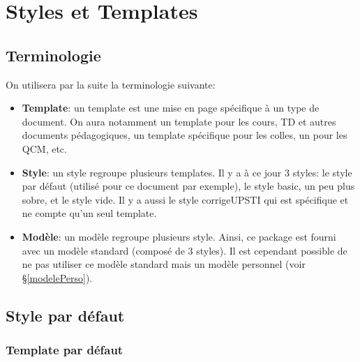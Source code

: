 \documentclass[11pt]{article}
\begin{document}
\section{Styles et Templates\label{styles}}
\subsection{Terminologie}
\noindent On utilisera par la suite la terminologie suivante:

\begin{itemize}
\item \textbf{Template}: un template est une mise en page spécifique à un type de document. On aura notamment un template pour les cours, TD et autres documents pédagogiques, un template spécifique pour les colles, un pour les QCM, etc.
\item \textbf{Style}: un style regroupe plusieurs templates. Il y a à ce jour 3 styles: le style par défaut (utilisé pour ce document par exemple), le style \og basic\fg{}, un peu plus sobre, et le style \og vide\fg{}. Il y a aussi le style \og corrigeUPSTI\fg{} qui est spécifique et ne compte qu'un seul template.
\item \textbf{Modèle}: un modèle regroupe plusieurs style. Ainsi, ce package est fourni avec un modèle standard (composé de 3 styles). Il est cependant possible de ne pas utiliser ce modèle standard mais un modèle personnel (voir \S \ref{modelePerso}).
\end{itemize}

\subsection{Style par défaut}



\subsubsection{Template par défaut}
\begin{figure}[!ht]
    \centering
\end{figure}
\end{document}

